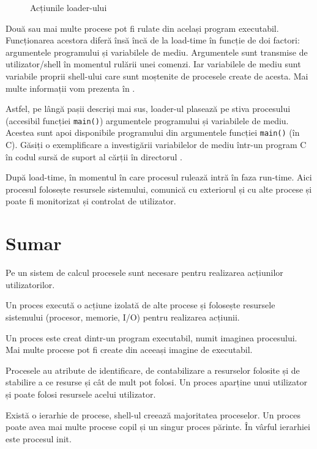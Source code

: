 \begin{figure}[!htbp]
	\centering
	\def\svgwidth{0.8\textwidth}
	
	\caption{Acțiunile loader-ului}
	\label{fig:process-loader}
\end{figure}

Două sau mai multe procese pot fi rulate din același program executabil.
Funcționarea acestora diferă însă încă de la load-time în funcție de doi
factori: argumentele programului și variabilele de mediu. Argumentele sunt
transmise de utilizator/shell în momentul rulării unei comenzi. Iar variabilele
de mediu sunt variabile proprii shell-ului care sunt moștenite de procesele
create de acesta. Mai multe informații vom prezenta în .

Astfel, pe lângă pașii descriși mai sus, loader-ul plasează pe stiva procesului
(accesibil funcției \texttt{main()}) argumentele programului și variabilele de mediu.
Acestea sunt apoi disponibile programului din argumentele funcției \texttt{main()} (în C). Găsiți o exemplificare a investigării variabilelor de mediu într-un program C în codul sursă de suport al cărții în directorul .

După load-time, în momentul în care procesul rulează intră în faza run-time.
Aici procesul folosește resursele sistemului, comunică cu exteriorul și cu alte
procese și poate fi monitorizat și controlat de utilizator.

\section{Sumar}
\label{sec:process-sumar}

Pe un sistem de calcul procesele sunt necesare pentru realizarea acțiunilor
utilizatorilor.

Un proces execută o acțiune izolată de alte procese și folosește resursele
sistemului (procesor, memorie, I/O) pentru realizarea acțiunii.

Un proces este creat dintr-un program executabil, numit imaginea procesului. Mai
multe procese pot fi create din aceeași imagine de executabil.

Procesele au atribute de identificare, de contabilizare a resurselor folosite și
de stabilire a ce resurse și cât de mult pot folosi. Un proces aparține unui
utilizator și poate folosi resursele acelui utilizator.

Există o ierarhie de procese, shell-ul creează majoritatea proceselor. Un proces
poate avea mai multe procese copil și un singur proces părinte. În vârful
ierarhiei este procesul init.

